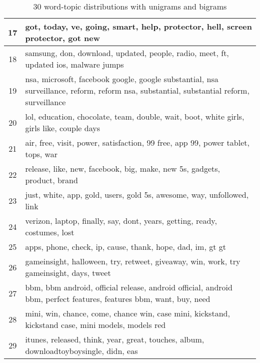 \begin{table}
\begin{tabular}{c p{16cm}}
    17    & got, today, ve, going, smart, help, protector, hell, screen protector, got new \\ \midrule
    18    & samsung, don, download, updated, people, radio, meet, ft, updated ios, malware jumps \\ \midrule
    19    & nsa, microsoft, facebook google, google substantial, nsa surveillance, reform, reform nsa, substantial, substantial reform, surveillance \\ \midrule
    20    & lol, education, chocolate, team, double, wait, boot, white girls, girls like, couple days \\ \midrule
    21    & air, free, visit, power, satisfaction, 99 free, app 99, power tablet, tops, war \\ \midrule
    22    & release, like, new, facebook, big, make, new 5s, gadgets, product, brand \\ \midrule
    23    & just, white, app, gold, users, gold 5s, awesome, way, unfollowed, link \\ \midrule
    24    & verizon, laptop, finally, say, dont, years, getting, ready, costumes, lost \\ \midrule
    25    & apps, phone, check, ip, cause, thank, hope, dad, im, gt gt \\ \midrule
    26    & gameinsight, halloween, try, retweet, giveaway, win, work, try gameinsight, days, tweet \\ \midrule
    27    & bbm, bbm android, official release, android official, android bbm, perfect features, features bbm, want, buy, need \\ \midrule
    28    & mini, win, chance, come, chance win, case mini, kickstand, kickstand case, mini models, models red \\ \midrule
    29    & itunes, released, think, year, great, touches, album, downloadtoyboysingle, didn, eas \\ \bottomrule
  \end{tabular}
  \caption{30 word-topic distributions with unigrams and bigrams}
  \label{tab:unigrams_bigrams_lda}
\end{table}


